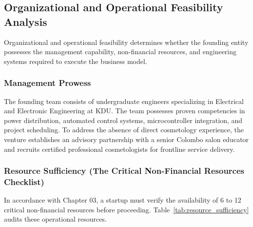 \subsection{Organizational and Operational Feasibility Analysis}
\label{subsec:org_op_feasibility}

Organizational and operational feasibility determines whether the founding entity possesses the management capability, non-financial resources, and engineering systems required to execute the business model.

\subsubsection{Management Prowess}
The founding team consists of undergraduate engineers specializing in Electrical and Electronic Engineering at KDU. The team possesses proven competencies in power distribution, automated control systems, microcontroller integration, and project scheduling. To address the absence of direct cosmetology experience, the venture establishes an advisory partnership with a senior Colombo salon educator and recruits certified professional cosmetologists for frontline service delivery.

\subsubsection{Resource Sufficiency (The Critical Non-Financial Resources Checklist)}
In accordance with Chapter 03, a startup must verify the availability of 6 to 12 critical non-financial resources before proceeding. Table~\ref{tab:resource_sufficiency} audits these operational resources.


